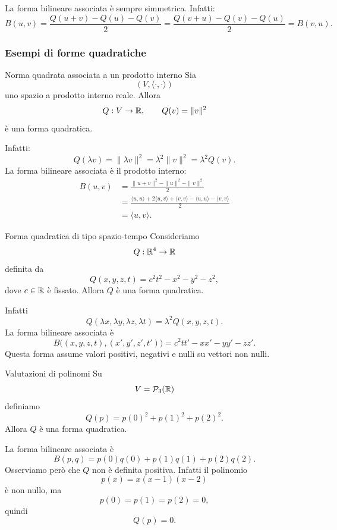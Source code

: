 \documentclass[a4paper]{article}
\begin{document}
La forma bilineare associata è sempre simmetrica. Infatti:
\[
    B(u,v)
    =
    \frac{Q(u+v)-Q(u)-Q(v)}{2}
    =
    \frac{Q(v+u)-Q(v)-Q(u)}{2}
    =
    B(v,u).
\]

\subsubsection{Esempi di forme quadratiche}

\begin{snippetexample}{Norma quadrata associata a un prodotto interno}
    Sia
    \[
        (V,\langle\cdot,\cdot\rangle)
    \]
    uno spazio a prodotto interno reale. Allora
    \[
        Q:V\to\mathbb{R},
        \qquad
        Q(v)=\|v\|^2
    \]
    è una forma quadratica.

    Infatti:
    \[
        Q(\lambda v)=\|\lambda v\|^2=\lambda^2\|v\|^2=\lambda^2Q(v).
    \]
    La forma bilineare associata è il prodotto interno:
    \begin{align*}
        B(u,v)
        &=
        \frac{\|u+v\|^2-\|u\|^2-\|v\|^2}{2}\\
        &=
        \frac{
            \langle u,u\rangle
            +2\langle u,v\rangle
            +\langle v,v\rangle
            -\langle u,u\rangle
            -\langle v,v\rangle
        }{2}\\
        &=
        \langle u,v\rangle.
    \end{align*}
\end{snippetexample}

\begin{snippetexample}{Forma quadratica di tipo spazio-tempo}
    Consideriamo
    \[
        Q:\mathbb{R}^4\to\mathbb{R}
    \]
    definita da
    \[
        Q(x,y,z,t)=c^2t^2-x^2-y^2-z^2,
    \]
    dove \(c\in\mathbb{R}\) è fissato. Allora \(Q\) è una forma quadratica.

    Infatti
    \[
        Q(\lambda x,\lambda y,\lambda z,\lambda t)
        =
        \lambda^2Q(x,y,z,t).
    \]
    La forma bilineare associata è
    \[
        B\bigl((x,y,z,t),(x',y',z',t')\bigr)
        =
        c^2tt'-xx'-yy'-zz'.
    \]
    Questa forma assume valori positivi, negativi e nulli su vettori non nulli.
\end{snippetexample}

\begin{snippetexample}{Valutazioni di polinomi}
    Su
    \[
        V=\mathcal{P}_3(\mathbb{R})
    \]
    definiamo
    \[
        Q(p)=p(0)^2+p(1)^2+p(2)^2.
    \]
    Allora \(Q\) è una forma quadratica.

    La forma bilineare associata è
    \[
        B(p,q)
        =
        p(0)q(0)+p(1)q(1)+p(2)q(2).
    \]
    Osserviamo però che \(Q\) non è definita positiva. Infatti il polinomio
    \[
        p(x)=x(x-1)(x-2)
    \]
    è non nullo, ma
    \[
        p(0)=p(1)=p(2)=0,
    \]
    quindi
    \[
        Q(p)=0.
    \]
\end{snippetexample}
\end{document}
